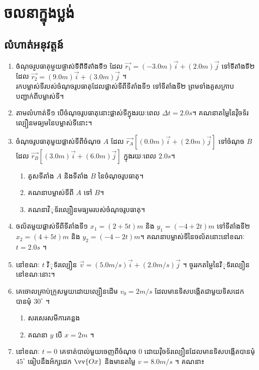 \chapter{ចលនាក្នុងប្លង់}
\section{លំហាត់អនុវត្តន៍}
\begin{enumerate}[m]
		\item ចំណុចរូបធាតុមួយផ្លាស់ទីពីទីតាំងទី១ ដែល $\vec{r_1} = \left(-3.0m\right)\vec{i}+\left(2.0m\right)\vec{j}$ ទៅទីតាំងទី២ ដែល $\vec{r_2}=\left(9.0m\right)\vec{i}+\left(3.0m\right)\vec{j}$ ។\\
		រកបម្លាស់ទីរបស់ចំណុចរូបធាតុដែលផ្លាស់ទីពីទីតាំងទី១ ទៅទីតាំងទី២ ព្រមទាំងគូសក្រាបបញ្ជាក់ពីបម្លាស់ទី។
		\item តាមលំហាត់ទី១ បើចំណុចរូបធាតុនោះផ្លាស់ទីក្នុងរយៈពេល $\Delta t=2.0s$។ គណនាតម្លៃនៃវុិចទ័រល្បឿនមធ្យមនៃបម្លាស់ទីនោះ។
		\item ចំណុចរូបធាតុមួយផ្លាស់ទីពីចំណុច $A$ ដែល $\vec{r_A}\left[\left(0.0m\right)\vec{i}+\left(2.0m\right)\vec{j}\right]$ ទៅចំណុច $B$ ដែល $\vec{r_B}\left[\left(3.0m\right)\vec{i}+\left(6.0m\right)\vec{j}\right]$ ក្នុងរយៈពេល $2.0s$។
		\begin{enumerate}[k]
			\item គូសទីតាំង $A$ និងទីតាំង $B$ នៃចំណុចរូបធាតុ។
			\item គណនាបម្លាស់ទីពី $A$ ទៅ $B$។
			\item គណនាវិុទ័រល្បឿនមធ្យមរបស់ចំណុចរូបធាតុ។
		\end{enumerate}
		\item ចល័តមួយផ្លាស់ទីពីទីតាំងទី១ $x_1=\left(2+5t\right)m$ និង $y_1=\left(-4+2t\right)m$ ទៅទីតាំងទី២ $x_2=\left(4+5t\right)m$ និង $y_2=\left(-4-2t\right)m$។ គណនាបម្លាស់ទីនៃចល័តនោះនៅខណៈ $t=2.0s$ ។
		\item នៅខណៈ $t$ វិុទ័រល្បឿន $\vec{v}=\left(5.0m/s\right)\vec{i}+\left(2.0m/s\right)\vec{j}$ ។ ចូររកតម្លៃនៃវិុទ័រល្បឿននៅខណៈនោះ។
		\item គេចោលគ្រាប់ក្រូសមួយដោយល្បឿនដើម $v_0=2m/s$ ដែលមានទិសបង្កើតជាមួយទិសដេកបានមុំ $30^\circ$ ។
		\begin{enumerate}[k]
			\item សរសេរសមីការគន្លង
			\item គណនា $y$ បើ $x=2m$ ។
		\end{enumerate}
		\item នៅខណៈ $t=0$ គេទាត់បាល់មួយចេញពីចំណុច $0$ ដោយវុិចទ័រល្បឿនដែលមានទិសបង្កើតបានមុំ $45^\circ$ ធៀបនឹងអ័ក្សដេក $\vv{Ox}$ និងមានតម្លៃ $v=8.0m/s$ ។ គណនា៖

\end{enumerate}
